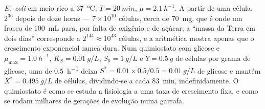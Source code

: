 \begin{example}\label{ex:b3:bacteriology:numbers}
\emph{E.~coli} em meio rico a \qty{37}{\celsius}: $T = \qty{20}{min}$,
$\mu = \qty{2.1}{h^{-1}}$. A partir de uma célula, $2^{36}$ depois de
doze horas --- $7\times 10^{10}$ células, cerca de \qty{70}{mg}, que é
onde um frasco de \qty{100}{mL} para, por falta de oxigênio e de
açúcar; a ``massa da Terra em dois dias'' corresponde a
$2^{144}\approx 10^{43}$ células, e a aritmética mostra apenas que o
crescimento exponencial nunca dura. Num quimiostato com glicose e
$\mu_{\max} = \qty{1.0}{h^{-1}}$, $K_{S} =
\qty{0.01}{g/L}$,
$S_{0} = \qty{1}{g/L}$ e $Y = \qty{0.5}{g}$ de células por grama de
glicose, uma  de \qty{0.5}{h^{-1}} deixa
$S^{*}
= 0.01\times 0.5/0.5 = \qty{0.01}{g/L}$ de glicose e mantém
$X^{*} =
\qty{0.495}{g/L}$ de células, dividindo-se a cada
\qty{83}{min}, indefinidamente. O quimiostato é como se estuda a
fisiologia a uma taxa de crescimento fixa, e como se rodam milhares de
gerações de evolução numa garrafa.
\end{example}

